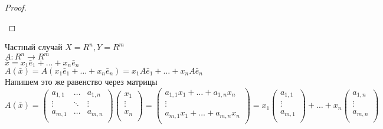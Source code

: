 \begin{Def}
\begin{proof}
\begin{enumerate}
\end{enumerate}
\end{proof}
Частный случай $X = R ^ n, Y = R ^ m$\\
$A \colon R ^ n \rightarrow R ^ m$\\
$\bar x = x_1 \bar e_1 + \dots + x_n \bar e_n$\\
$A(\bar x) = A(x_1 \bar e_1 + \dots + x_n \bar e_n) = x_1A \bar e_1 + \dots + x_nA \bar e_n$ \\
Напишем это же равенство через матрицы\\
$A(\bar x) = 
\begin{pmatrix}
a_{1, 1} & \dots & a_{1, n}\\
\vdots & \ddots & \vdots\\
a_{m, 1} & \dots & a_{m, n}\\
\end{pmatrix}
\begin{pmatrix}
x_1\\
\vdots\\
x_n\\
\end{pmatrix} = 
\begin{pmatrix}
a_{1, 1}x_1 + \dots + a_{1, n}x_n\\
\vdots\\
a_{m, 1}x_1 + \dots + a_{m, n}x_n\\
\end{pmatrix} = x_1
\begin{pmatrix}
a_{1, 1}\\
\vdots\\
a_{m, 1}\\
\end{pmatrix} + \dots + x_n
\begin{pmatrix}
a_{1, n}\\
\vdots\\
a_{m, n}\\
\end{pmatrix}$


\end{Def}

